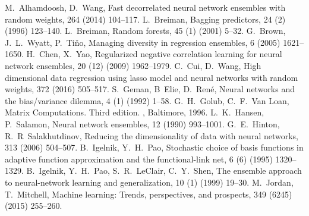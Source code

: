 \documentclass{article}
\begin{document}

%
\begin{thebibliography}{}
M.~Alhamdoosh, D.~Wang, 
\newblock Fast decorrelated neural network ensembles with random weights,
 264 (2014) 104--117.
L.~Breiman,
\newblock Bagging predictors,
 24 (2) (1996) 123--140.
L.~Breiman,
\newblock Random forests,
 45 (1) (2001) 5--32.
G.~Brown, J.~L.~Wyatt, P.~Ti{\v{n}}o,
\newblock Managing diversity in regression ensembles,
 6 (2005) 1621--1650.
H.~Chen, X.~Yao,
\newblock Regularized negative correlation learning for neural network
  ensembles,
 20 (12) (2009) 1962--1979.
C.~Cui, D.~Wang,
\newblock High dimensional data regression using lasso model and neural networks with random weights,
 372 (2016) 505--517.
S.~Geman, B~Elie, D.~Ren{\'e},
\newblock Neural networks and the bias/variance dilemma,
 4 (1) (1992) 1--58.
G.~H.~Golub, C.~F.~Van Loan,
\newblock Matrix Computations. Third edition. 
, Baltimore, 1996. 
L.~K.~Hansen, P.~Salamon,
\newblock Neural network ensembles,
 12 (1990) 993--1001.
G.~E.~Hinton, R.~R~Salakhutdinov,
\newblock Reducing the dimensionality of data with neural networks,
  313 (2006) 504--507.
B.~Igelnik, Y.~H.~Pao,
\newblock Stochastic choice of basis functions in adaptive function approximation and the functional-link net,
 6 (6) (1995) 1320--1329.
B.~Igelnik, Y.~H.~Pao, S.~R.~LeClair, C.~Y.~Shen,
\newblock The ensemble approach to neural-network learning and generalization,
 10 (1) (1999) 19--30.
M.~Jordan, T.~Mitchell,
\newblock Machine learning: Trends, perspectives, and prospects,
 349 (6245) (2015) 255--260.

\end{thebibliography}
\end{document}
